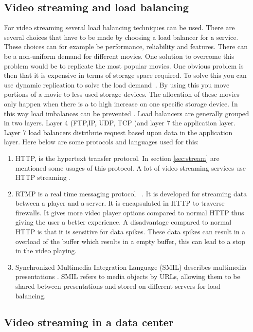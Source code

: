 \documentclass{sig-alternate-br}
\begin{document}
\subsection{Video streaming and load balancing}
For video streaming several load balancing techniques can be used. There are several choices that have to be made by choosing a load balancer for a service. These choices can for example be performance, reliability and features. There can be a non-uniform demand for different movies. One solution to overcome this problem would be to replicate the most popular movies. One obvious problem is then that it is expensive in terms of storage space required. To solve this you can use dynamic replication to solve the load demand~\cite{dan1996load}. By using this you move portions of a movie to less used storage devices. The allocation of these movies only happen when there is a to high increase on one specific storage device. In this way load imbalances can be prevented \cite{dan1996load}. \newline
Load balancers are generally grouped in two layers. Layer 4 (FTP,IP, UDP, TCP )and layer 7 the application layer. Layer 7 load balancers distribute request based upon data in the application layer. Here below are some protocols and languages used for this:
\begin{enumerate}[topsep=0pt,itemsep=-1ex,partopsep=1ex,parsep=1ex]
	\item HTTP, is the hypertext transfer protocol. In section \ref{sec:stream} are mentioned some usages of this protocol. A lot of video streaming services use HTTP streaming \cite{Adhikari:2012}.  
	\item RTMP is a real time messaging protocol ~\cite{rtmp}. It is developed for streaming data between a player and a server. It is encapsulated in HTTP to traverse firewalls. It gives more video player options compared to normal HTTP thus giving the user a better experience. A disadvantage compared to normal HTTP is that it is sensitive for data spikes. These data spikes can result in a overload of the buffer which results in a empty buffer, this can lead to a stop in the video playing. 
	\item Synchronized Multimedia Integration Language (SMIL) describes multimedia presentations \cite{smil}. SMIL refers to media objects by URLs, allowing them to be shared between presentations and stored on different servers for load balancing. 
\end{enumerate}


\subsection{Video streaming in a data center}
\end{document}
